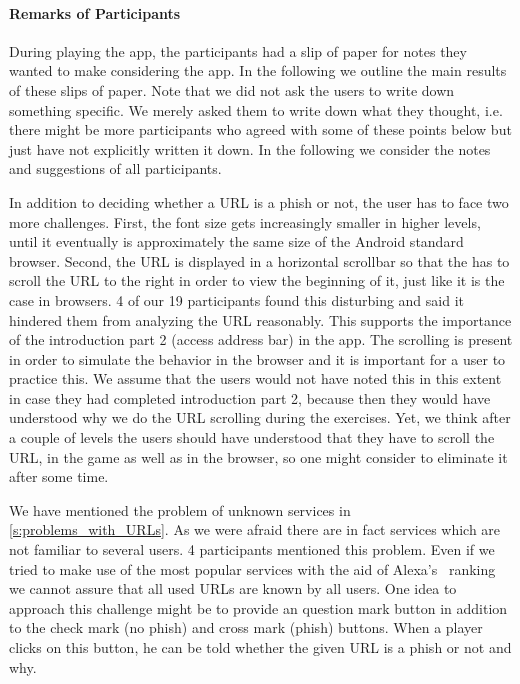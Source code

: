 \paragraph{Remarks of Participants}
During playing the app, the participants had a slip of paper for notes they wanted to make considering the app.
In the following we outline the main results of these slips of paper.
Note that we did not ask the users to write down something specific. 
We merely asked them to write down what they thought, i.e. there might be more participants who agreed with some of these points below but just have not explicitly written it down.
In the following we consider the notes and suggestions of all participants. 
\begin{description}[leftmargin=0cm]	
	\item[Scrolling of URL:] In addition to deciding whether a URL is a phish or not, the user has to face two more challenges. 
First, the font size gets increasingly smaller in higher levels, until it eventually is approximately the same size of the Android standard browser.
Second, the URL is displayed in a horizontal scrollbar so that the has to scroll the URL to the right in order to view the beginning of it, just like it is the case in browsers.
4 of our 19 participants found this disturbing and said it hindered them from analyzing the URL reasonably. 
This supports the importance of the introduction part 2 (access address bar) in the app.
The scrolling is present in order to simulate the behavior in the browser and it is important for a user to practice this.
We assume that the users would not have noted this in this extent in case they had completed introduction part 2, because then they would have understood why we do the URL scrolling during the exercises.
Yet, we think after a couple of levels the users should have understood that they have to scroll the URL, in the game as well as in the browser, so one might consider to eliminate it after some time. 
	\item[Unknown Services:] We have mentioned the problem of unknown services in \autoref{s:problems_with_URLs}.
As we were afraid there are in fact services which are not familiar to several users.
4 participants mentioned this problem.
Even if we tried to make use of the most popular services with the aid of Alexa's~\cite{alexa} ranking we cannot assure that all used URLs are known by all users.
One idea to approach this challenge might be to provide an question mark button in addition to the check mark (no phish) and cross mark (phish) buttons. 
When a player clicks on this button, he can be told whether the given URL is a phish or not and why.

\end{description}
